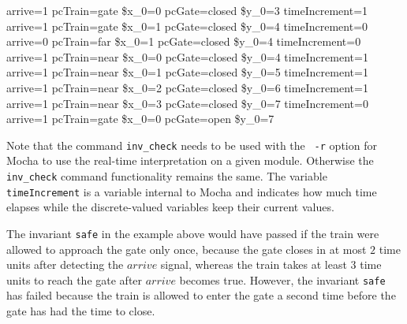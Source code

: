 {arrive=1 pcTrain=gate \$x\_0=0 pcGate=closed  \$y\_0=3 timeIncrement=1  \\ 
arrive=1 pcTrain=gate \$x\_0=1 pcGate=closed  \$y\_0=4 timeIncrement=0  \\ 
arrive=0 pcTrain=far  \$x\_0=1 pcGate=closed  \$y\_0=4 timeIncrement=0  \\
arrive=1 pcTrain=near \$x\_0=0 pcGate=closed  \$y\_0=4 timeIncrement=1  \\
arrive=1 pcTrain=near \$x\_0=1 pcGate=closed  \$y\_0=5 timeIncrement=1  \\
arrive=1 pcTrain=near \$x\_0=2 pcGate=closed  \$y\_0=6 timeIncrement=1  \\
arrive=1 pcTrain=near \$x\_0=3 pcGate=closed  \$y\_0=7 timeIncrement=0  \\
arrive=1 pcTrain=gate \$x\_0=0 pcGate=open    \$y\_0=7                  \\
}

Note that the command {\tt inv\_check} needs to be used with the {\tt
-r} option for {\sc Mocha} to use the real-time interpretation on a
given module. Otherwise the {\tt inv\_check} command functionality
remains the same. The variable {\tt timeIncrement} is a variable
internal to {\sc Mocha} and indicates how much time elapses while the
discrete-valued variables keep their current values. 

The invariant {\tt safe} in the example above would have passed if the
train were allowed to approach the gate only once, because the gate
closes in at most $2$ time units after detecting the $arrive$ signal,
whereas the train takes at least $3$ time units to reach the gate
after $arrive$ becomes true. However, the invariant {\tt safe} has
failed because the train is allowed to enter the gate a second time
before the gate has had the time to close. 





